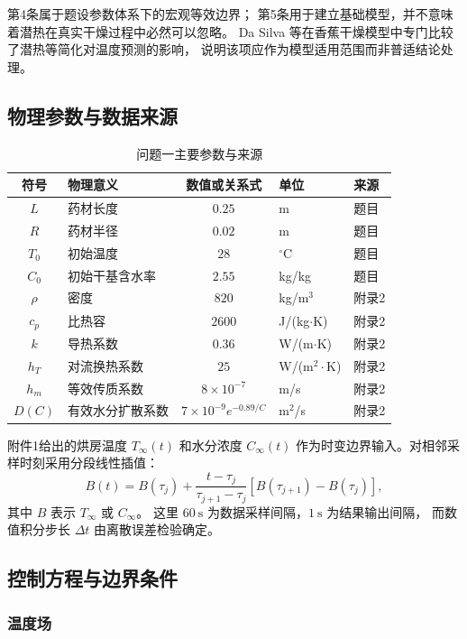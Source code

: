 \documentclass[UTF8,a4paper,11pt]{ctexart}
\begin{document}
第4条属于题设参数体系下的宏观等效边界；
第5条用于建立基础模型，并不意味着潜热在真实干燥过程中必然可以忽略。
Da Silva 等在香蕉干燥模型中专门比较了潜热等简化对温度预测的影响，
说明该项应作为模型适用范围而非普适结论处理\cite{dasilva2014}。

\subsection{物理参数与数据来源}

\begin{table}[H]
\centering
\caption{问题一主要参数与来源}
\begin{tabular}{clcll}
\toprule
符号 & 物理意义 & 数值或关系式 & 单位 & 来源\\
\midrule
$L$ & 药材长度 & $0.25$ & m & 题目\\
$R$ & 药材半径 & $0.02$ & m & 题目\\
$T_0$ & 初始温度 & $28$ & $^\circ$C & 题目\\
$C_0$ & 初始干基含水率 & $2.55$ & kg/kg & 题目\\
$\rho$ & 密度 & $820$ & kg/m$^3$ & 附录2\\
$c_p$ & 比热容 & $2600$ & J/(kg$\cdot$K) & 附录2\\
$k$ & 导热系数 & $0.36$ & W/(m$\cdot$K) & 附录2\\
$h_T$ & 对流换热系数 & $25$ & W/(m$^2\cdot$K) & 附录2\\
$h_m$ & 等效传质系数 & $8\times10^{-7}$ & m/s & 附录2\\
$D(C)$ & 有效水分扩散系数 & $7\times10^{-9}e^{-0.89/C}$ & m$^2$/s & 附录2\\
\bottomrule
\end{tabular}
\end{table}

附件1给出的烘房温度 $T_\infty(t)$ 和水分浓度 $C_\infty(t)$
作为时变边界输入。对相邻采样时刻采用分段线性插值：
\[
B(t)=B(\tau_j)+
\frac{t-\tau_j}{\tau_{j+1}-\tau_j}
\left[B(\tau_{j+1})-B(\tau_j)\right],
\]
其中 $B$ 表示 $T_\infty$ 或 $C_\infty$。
这里 $60~\mathrm s$ 为数据采样间隔，$1~\mathrm s$ 为结果输出间隔，
而数值积分步长 $\Delta t$ 由离散误差检验确定。

\subsection{控制方程与边界条件}

\subsubsection{温度场}
\end{document}

